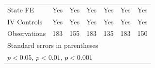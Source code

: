 {\begin{tabular}{l*{6}{c}}
State FE            &         Yes         &         Yes         &         Yes         &         Yes         &         Yes         &         Yes         \\
IV Controls         &         Yes         &         Yes         &         Yes         &         Yes         &         Yes         &         Yes         \\
Observations        &         183         &         155         &         183         &         135         &         183         &         150         \\
\bottomrule
\multicolumn{7}{l}{\footnotesize Standard errors in parentheses}\\
\multicolumn{7}{l}{\footnotesize \sym{*} \(p<0.05\), \sym{**} \(p<0.01\), \sym{***} \(p<0.001\)}\\
\end{tabular}
}
